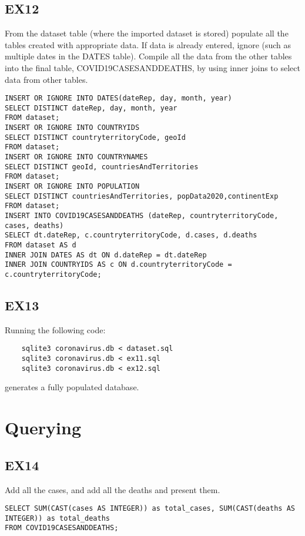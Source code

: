 \documentclass{article}
\begin{document}
\subsection{EX12}
From the dataset table (where the imported dataset is stored) populate all the tables created with appropriate data. If data is already entered, ignore (such as multiple dates in the DATES table). Compile all the data from the other tables into the final table, COVID19CASESANDDEATHS, by using inner joins to select data from other tables. 
\begin{verbatim}
INSERT OR IGNORE INTO DATES(dateRep, day, month, year) 
SELECT DISTINCT dateRep, day, month, year 
FROM dataset;
INSERT OR IGNORE INTO COUNTRYIDS 
SELECT DISTINCT countryterritoryCode, geoId 
FROM dataset;
INSERT OR IGNORE INTO COUNTRYNAMES 
SELECT DISTINCT geoId, countriesAndTerritories 
FROM dataset;
INSERT OR IGNORE INTO POPULATION 
SELECT DISTINCT countriesAndTerritories, popData2020,continentExp 
FROM dataset;
INSERT INTO COVID19CASESANDDEATHS (dateRep, countryterritoryCode, cases, deaths)
SELECT dt.dateRep, c.countryterritoryCode, d.cases, d.deaths 
FROM dataset AS d 
INNER JOIN DATES AS dt ON d.dateRep = dt.dateRep 
INNER JOIN COUNTRYIDS AS c ON d.countryterritoryCode = c.countryterritoryCode;
\end{verbatim}

\subsection{EX13}
Running the following code: 
\begin{verbatim}
    sqlite3 coronavirus.db < dataset.sql
    sqlite3 coronavirus.db < ex11.sql
    sqlite3 coronavirus.db < ex12.sql
\end{verbatim}
generates a fully populated database.


\section{Querying}
\subsection{EX14}
Add all the cases, and add all the deaths and present them.
\begin{verbatim}
SELECT SUM(CAST(cases AS INTEGER)) as total_cases, SUM(CAST(deaths AS INTEGER)) as total_deaths 
FROM COVID19CASESANDDEATHS;
\end{verbatim}
\end{document}
